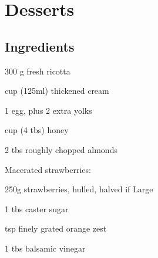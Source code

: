 \chapter{Desserts}



\section*{Ingredients}
\begin{ingredients-list}
	\item 300 g fresh ricotta
	\item {} cup (125ml) thickened cream
	\item 1 egg, plus 2 extra yolks
	\item {} cup (4 tbs) honey
	\item 2 tbs roughly chopped almonds
\end{ingredients-list}
Macerated strawberries:
\begin{ingredients-list}
	\item 250g strawberries, hulled, halved if Large
	\item 1 tbs caster sugar
	\item {} tsp finely grated orange zest
	\item 1 tbs balsamic vinegar
\end{ingredients-list}

